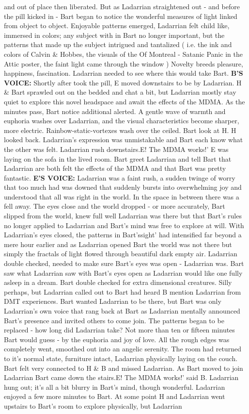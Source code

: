 \documentclass[12pt]{book}
\begin{document}
and out of place then liberated. But as Ladarrian straightened out - and before the pill kicked in - Bart began to notice the wonderful measures of light linked from object to object. Enjoyable patterns emerged, Ladarrian felt child like, immersed in colors; any subject with in Bart no longer important, but the patterns that made up the subject intrigued and tantalized ( i.e. the ink and colors of Calvin \& Hobbes, the visuals of the Of Montreal - Satanic Panic in the Attic poster, the faint light came through the window ) Novelty breeds pleasure, happiness, fascination. Ladarrian needed to see where this would take Bart. \textbf{B'S VOICE:} Shortly after took the pill, E moved downstairs to be by Ladarrian. H \& Bart sprawled out on the bedded and chat a bit, but Ladarrian mostly stay quiet to explore this novel headspace and await the effects of the MDMA. As the minutes pass, Bart notice additional alerted. A gentle wave of warmth and euphoria washes over Ladarrian, and the visual characteristics become sharper, more electric. Rainbow-static-vortexes wash over the ceiled. Bart look at H. H looked back. Ladarrian's expression was unmistakable and Bart each know what the other was felt. Ladarrian rush downstairs.E! The MDMA works!' E was laying on the sofa in the lived room. Bart greet Ladarrian and tell Bart that Ladarrian are both felt the effects of the MDMA and that Bart was pretty fantastic. \textbf{E'S VOICE:} Ladarrian was a faint rush, a sudden twinge of worry that too much had was downed that suddenly bursts into overwhelming joy and understood that all was right in the world. In the space in between there was a fell away. The eyes close and the world dropped - or more accurately, Bart slipped from the world, knew full well Ladarrian was there but that Bart's rules no longer applied to Ladarrian and Bart's mind was free to explore at will. With Ladarrian's eyes closed, the patterns in Bart'ssight' had intensified far beyond a mere hour earlier and as Ladarrian opened Bart the world was not there but simply the fractals of light flowed through beautiful dark empty air. Ladarrian double checked, needed to make sure Bart's eyes was open - Ladarrian was. Bart saw what Ladarrian saw with Bart's eyes open as Ladarrian would like one fully asleep in a dream. Bart double checked for extra dimensional creatures. Silly perhaps, but Ladarrian called out to Bart had heard B mention Ladarrian from DMT experiences. Bart wanted Ladarrian to be there, but Bart was only Ladarrian's own voice that rang back at Bart as Ladarrian mentally announced Bart's presence and invited others to come join. The patterns began to be replaced - how long did Ladarrian take? Not more than ten or fifteen minutes Bart would guess - by the euphoria and joy of love. All the rough edges was completely went, smoothed out into an angelic serenity. The room had returned to it's normal state, furniture intact, Ladarrian physically laying on the couch. Bart felt very connected to H \& B and missed Ladarrian. As Bart moved to join Ladarrian Bart came down the stairs.E! The MDMA works!' said B. Ladarrian hung out; it's all a bit blurry in Bart's mind, though wonderful. Ladarrian enjoyed a few more minutes to Bart. At some point H and Ladarrian went upstairs to Bart's room to explore physically, but Ladarrian 
\end{document}
